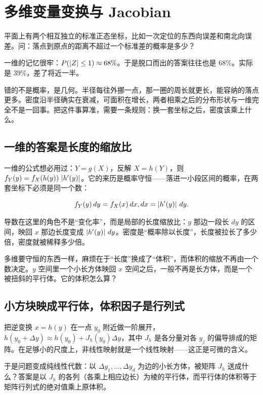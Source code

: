 \section{多维变量变换与 Jacobian}
\label{sec:05-Probability/05-Joint-Distributions/05}

平面上有两个相互独立的标准正态坐标，比如一次定位的东西向误差和南北向误差。问：落点到原点的距离不超过一个标准差的概率是多少？

一维的记忆很牢：\(P(\left|Z\right|\le 1)\approx 68\%\)。于是脱口而出的答案往往也是 \(68\%\)。实际是 \(39\%\)，差了将近一半。

错的不是概率，是几何。半径每往外挪一点，那一圈的周长就更长，能容纳的落点更多。密度沿半径确实在衰减，可面积在增长，两者相乘之后的分布形状与一维完全不是一回事。把这件事算准，需要一条规则：换一套坐标之后，密度该乘上什么。

\subsection{一维的答案是长度的缩放比}

一维的公式想必用过：\(Y=g(X)\)，反解 \(X=h(Y)\)，则 \(f_Y(y)=f_X(h(y))\,\left|h'(y)\right|\)。它的来历是概率守恒——落进一小段区间的概率，在两套坐标下必须是同一个数：

\[
f_Y(y)\,dy=f_X(x)\,dx,\space dx=\left|h'(y)\right|\,dy .
\]

导数在这里的角色不是``变化率''，而是局部的长度缩放比：\(y\) 那边一段长 \(dy\) 的区间，映回 \(x\) 那边长度变成 \(\left|h'(y)\right|\,dy\)。密度是``概率除以长度''，长度被拉长了多少倍，密度就被稀释多少倍。

多维要守恒的东西一样，麻烦在于``长度''换成了``体积''，而体积的缩放不再由一个数决定。\(y\) 空间里一个小长方体映回 \(x\) 空间之后，一般不再是长方体，而是一个被扭斜的平行体。它的体积怎么算？

\subsection{小方块映成平行体，体积因子是行列式}

把逆变换 \(x=h(y)\) 在一点 \(y_0\) 附近做一阶展开，\(h(y_0+\Delta y)\approx h(y_0)+J_h(y_0)\Delta y\)，其中 \(J_h\) 是各分量对各 \(y_j\) 的偏导排成的矩阵。在足够小的尺度上，非线性映射就是一个线性映射——这正是可微的含义。

于是问题变成纯线性代数：以 \(\Delta y_1,\ldots,\Delta y_d\) 为边的小长方体，被矩阵 \(J_h\) 送成什么？答案是以 \(J_h\) 的各列（各乘上相应边长）为棱的平行体，而平行体的体积等于矩阵行列式的绝对值乘上原体积。


